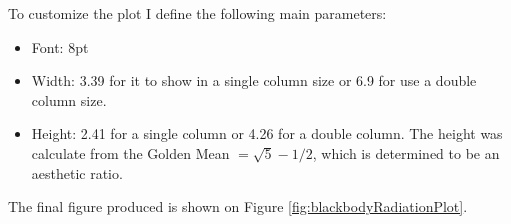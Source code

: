 \begin{enumerate}
    To customize the plot I define the following main parameters:
        \begin{itemize}
            \item Font: 8pt
            \item Width: 3.39 for it to show in a single column size or 6.9 for use a double column size. 
            \item Height: 2.41 for a single column or 4.26 for a double column. The height was calculate from the Golden Mean $= \sqrt{5}-1 / 2 $, which is determined to be an aesthetic ratio. 
        \end{itemize}
\end{enumerate}

The final figure produced is shown on Figure  \ref{fig:blackbodyRadiationPlot}.